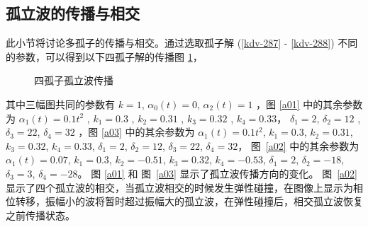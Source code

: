 \subsection{孤立波的传播与相交}
此小节将讨论多孤子的传播与相交。通过选取孤子解 (\ref{kdv-287} - \ref{kdv-288}) 不同的参数，可以得到以下四孤子解的传播图 \ref{a0}，
\begin{figure}[th]
\centering
{}
\qquad
\subfigure[]{
\texttt{[image: a02.jpg]}
\label{a02}
}
\caption{四孤子孤立波传播}
\label{a0}
\end{figure}
其中三幅图共同的参数有 $k=1$, $\alpha_0(t)=0$, $\alpha_2(t)=1$ ，图 \ref{a01} 中的其余参数为 $\alpha_1(t)=0.1 t^2$ , $k_1=0.3$ , $k_2=0.31$ , $k_3=0.32$ , $k_4=0.33$，
$\delta_1=2$, $\delta_2=12$ , $\delta_3=22$, $\delta_4=32$ ，图 \ref{a03} 中的其余参数为 $\alpha_1(t)=0.1 t^2$, $k_1=0.3$, $k_2=0.31$, $k_3=0.32$, $k_4=0.33$,
$\delta_1=2$, $\delta_2=12$, $\delta_3=22$, $\delta_4=32$，
图~\ref{a02} 中的其余参数为 $\alpha_1(t)=0.07$, $k_1=0.3$, $k_2=-0.51$, $k_3=0.32$, $k_4=-0.53$,
$\delta_1=2$, $\delta_2=-18$, $\delta_3=3$, $\delta_4=-28$。
图 \ref{a01} 和 图~\ref{a03} 显示了孤立波传播方向的变化。 图~\ref{a02} 显示了四个孤立波的相交，当孤立波相交的时候发生弹性碰撞，在图像上显示为相位转移，振幅小的波将暂时超过振幅大的孤立波，在弹性碰撞后，相交孤立波恢复之前传播状态。

